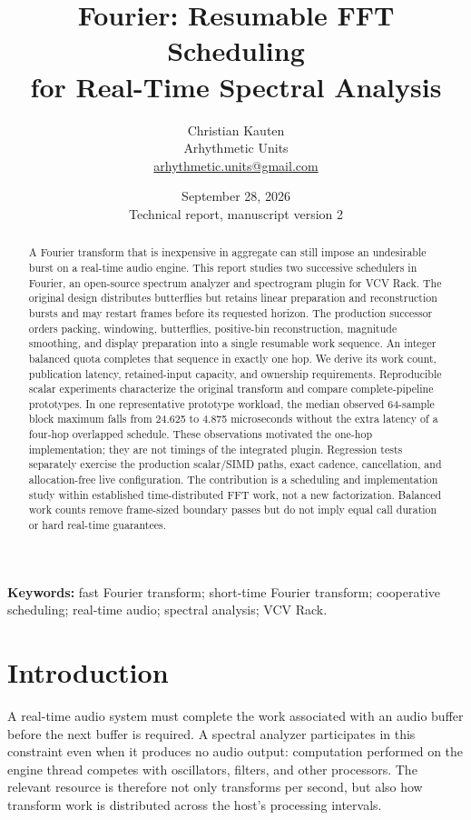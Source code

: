 \documentclass[11pt,letterpaper]{article}
\title{\textbf{Fourier: Resumable FFT Scheduling\\for Real-Time Spectral Analysis}}
\author{Christian Kauten\\\small Arhythmetic Units\\\small\href{mailto:arhythmetic.units@gmail.com}{arhythmetic.units@gmail.com}}
\date{September 28, 2026\\\small Technical report, manuscript version 2}
\begin{document}
\maketitle
\begin{abstract}
A Fourier transform that is inexpensive in aggregate can still impose an
undesirable burst on a real-time audio engine. This report studies two
successive schedulers in Fourier, an open-source spectrum analyzer and
spectrogram plugin for VCV Rack. The original design distributes butterflies
but retains linear preparation and reconstruction bursts and may restart frames
before its requested horizon. The production successor orders packing,
windowing, butterflies, positive-bin reconstruction, magnitude smoothing, and
display preparation into a single resumable work sequence. An integer balanced
quota completes that sequence in exactly one hop. We derive its work count,
publication latency, retained-input capacity, and ownership requirements.
Reproducible scalar experiments characterize the original transform and compare
complete-pipeline prototypes. In one representative prototype workload, the
median observed 64-sample block maximum falls from 24.625 to 4.875 microseconds
without the extra latency of a four-hop overlapped schedule. These observations
motivated the one-hop implementation; they are not timings of the integrated
plugin. Regression tests separately exercise the production scalar/SIMD paths,
exact cadence, cancellation, and allocation-free live configuration. The
contribution is a scheduling and implementation study within established
time-distributed FFT work, not a new factorization. Balanced work counts remove
frame-sized boundary passes but do not imply equal call duration or hard
real-time guarantees.
\end{abstract}
\noindent\textbf{Keywords:} fast Fourier transform; short-time Fourier transform;
cooperative scheduling; real-time audio; spectral analysis; VCV Rack.

\section{Introduction}
A real-time audio system must complete the work associated with an audio buffer
before the next buffer is required. A spectral analyzer participates in this
constraint even when it produces no audio output: computation performed on the
engine thread competes with oscillators, filters, and other processors. The
relevant resource is therefore not only transforms per second, but also how
transform work is distributed across the host's processing intervals.
\end{document}
